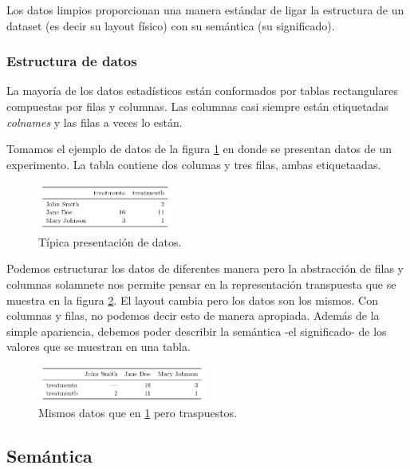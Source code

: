 \documentclass[]{article}
\begin{document}
Los datos limpios proporcionan una manera estándar de ligar la
estructura de un dataset (es decir su layout físico) con su semántica
(su significado).

\subsubsection{Estructura de datos}\label{estructura-de-datos}

La mayoría de los datos estadísticos están conformados por tablas
rectangulares compuestas por filas y columnas. Las columnas casi siempre
están etiquetadas \emph{colnames} y las filas a veces lo están.

Tomamos el ejemplo de datos de la figura \ref{fig:estructura} en donde
se presentan datos de un experimento. La tabla contiene dos columas y
tres filas, ambas etiquetaadas.

\begin{figure}[h]
    \centering
    \includegraphics[width=0.4\textwidth]{../img/02_estructura.png}
    \caption{Típica presentación de datos.}
    \label{fig:estructura}
\end{figure}

Podemos estructurar los datos de diferentes manera pero la abstracción
de filas y columnas solamnete nos permite pensar en la representación
transpuesta que se muestra en la figura \ref{fig:estructurat}. El layout
cambia pero los datos son los mismos. Con columnas y filas, no podemos
decir esto de manera apropiada. Además de la simple apariencia, debemos
poder describir la semántica -el significado- de los valores que se
muestran en una tabla.

\begin{figure}[h]
    \centering
    \includegraphics[width=0.5\textwidth]{../img/02_estructurat.png}
    \caption{Mismos datos que en \ref{fig:estructura} pero traspuestos.}
    \label{fig:estructurat}
\end{figure}

\subsection{Semántica}\label{semantica}
\end{document}
